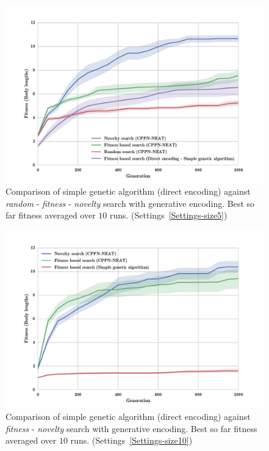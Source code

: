 \begin{figure}[t!]
\centering
\includegraphics[width=1.0\textwidth]{../Figures/Results/FitNovRandomDirectSize5.pdf}
\caption{Comparison of simple genetic algorithm (direct encoding) against \emph{random} - \emph{fitness} - \emph{novelty} search with generative encoding. Best so far fitness averaged over $10$ runs. (Settings~\ref{Settings-size5})}
\label{fig:FitNovRandomDirectSize5}
\end{figure}

\begin{figure}[t!]
\centering
\includegraphics[width=1.0\textwidth]{../Figures/Results/FitvsNovVsDirSize10.pdf}
\caption{Comparison of simple genetic algorithm (direct encoding) against \emph{fitness} - \emph{novelty} search with generative encoding. Best so far fitness averaged over $10$ runs. (Settings~\ref{Settings-size10})}
\label{fig:FitvsNovVsDirSize10}
\end{figure}

